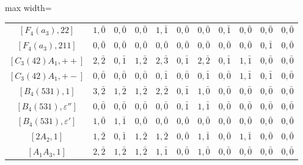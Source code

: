 \begin{table}[!ht]
\begin{adjustbox}{max width=\linewidth}
\begin{tabular}{|c|cccccccccc|}
        $[F_4(a_3),22]$ & $1,\bar0$ & $0,\bar0$ & $0,\bar0$ & $1,\bar1$ & $0,\bar0$ & $0,\bar0$ & $0,\bar1$ & $0,\bar0$ & $0,\bar0$ & $0,\bar0$ \\
        $[F_4(a_3),211]$ & $0,\bar0$ & $0,\bar0$ & $0,\bar0$ & $0,\bar0$ & $0,\bar0$ & $0,\bar0$ & $0,\bar0$ & $0,\bar0$ & $0,\bar1$ & $0,\bar0$ \\
        $[C_3(42)A_1,++]$ & $2,\bar2$ & $0,\bar1$ & $1,\bar2$ & $2,\bar{3}$ & $0,\bar1$ & $2,\bar2$ & $0,\bar1$ & $1,\bar1$ & $0,\bar0$ & $0,\bar0$ \\
        $[C_3(42)A_1,+-]$ & $0,\bar0$ & $0,\bar0$ & $0,\bar0$ & $0,\bar1$ & $0,\bar0$ & $0,\bar1$ & $0,\bar0$ & $1,\bar1$ & $0,\bar1$ & $0,\bar0$ \\
        $[B_4(531),1]$ & $3,\bar2$ & $1,\bar2$ & $1,\bar2$ & $2,\bar2$ & $0,\bar1$ & $1,\bar0$ & $0,\bar0$ & $0,\bar0$ & $0,\bar0$ & $0,\bar0$ \\
        $[B_4(531),\varepsilon'']$ & $0,\bar0$ & $0,\bar0$ & $0,\bar0$ & $0,\bar0$ & $0,\bar1$ & $1,\bar1$ & $0,\bar0$ & $0,\bar0$ & $0,\bar0$ & $0,\bar0$ \\
        $[B_4(531),\varepsilon']$ & $1,\bar0$ & $1,\bar1$ & $0,\bar0$ & $0,\bar0$ & $0,\bar0$ & $0,\bar0$ & $0,\bar0$ & $0,\bar0$ & $0,\bar0$ & $0,\bar0$ \\
        $[2A_2,1]$ & $1,\bar2$ & $0,\bar1$ & $1,\bar2$ & $1,\bar2$ & $0,\bar0$ & $1,\bar1$ & $0,\bar0$ & $1,\bar1$ & $0,\bar0$ & $0,\bar0$ \\
        $[A_1A_3,1]$ & $2,\bar2$ & $1,\bar2$ & $1,\bar2$ & $1,\bar1$ & $0,\bar0$ & $1,\bar0$ & $0,\bar0$ & $0,\bar0$ & $0,\bar0$ & $0,\bar0$ \\\hline
        \end{tabular}
        \end{adjustbox}
    \end{table}

    \vspace{1cm}

